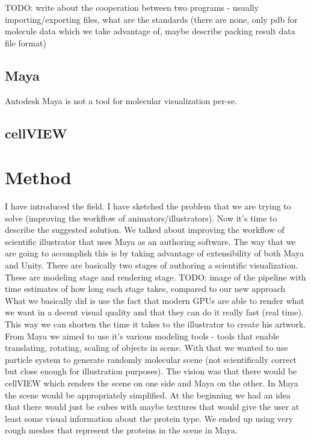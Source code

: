 \documentclass[
  digital, %
  table,   %
  lof,     %
  lot,     %
]{fithesis3}
\begin{document}
TODO: write about the cooperation between two programs - usually importing/exporting files, what are the standards (there are none, only pdb for molecule data which we take advantage of, maybe describe packing result data file format)

\section{Maya}
Autodesk Maya is not a tool for molecular visualization per-se.
\section{cellVIEW}

\chapter{Method}
I have introduced the field. I have sketched the problem that we are trying to solve (improving the workflow of animators/illustrators). Now it's time to describe the suggested solution.
We talked about improving the workflow of scientific illustrator that uses Maya as an authoring software. The way that we are going to accomplish this is by taking advantage of extensibility of both Maya and Unity. 
There are basically two stages of authoring a scientific visualization. These are modeling stage and rendering stage. 
TODO: image of the pipeline with time estimates of how long each stage takes, compared to our new approach
What we basically did is use the fact that modern GPUs are able to render what we want in a decent visual quality and that they can do it really fast (real time). This way we can shorten the time it takes to the illustrator to create his artwork.
From Maya we aimed to use it's various modeling tools - tools that enable translating, rotating, scaling of objects in scene. With that we wanted to use particle system to generate randomly molecular scene (not scientifically correct but close enough for illustration purposes).
The vision was that there would be cellVIEW which renders the scene on one side and Maya on the other. In Maya the scene would be appropriately simplified. At the beginning we had an idea that there would just be cubes with maybe textures that would give the user at least some visual information about the protein type. We ended up using very rough meshes that represent the proteins in the scene in Maya.
\end{document}
